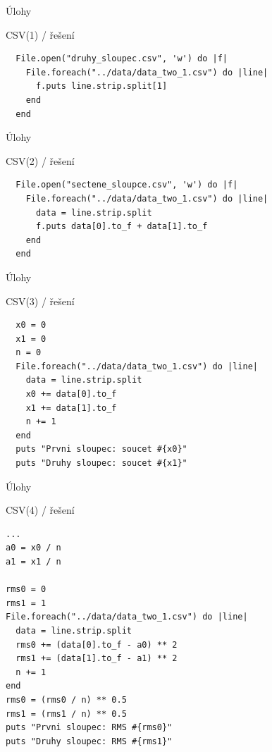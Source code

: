 \documentclass{beamer}
\begin{document}
\begin{frame}[fragile]{Úlohy}
  \begin{block}{CSV(1) / řešení}
    \scriptsize
\begin{verbatim}
  File.open("druhy_sloupec.csv", 'w') do |f|
    File.foreach("../data/data_two_1.csv") do |line|
      f.puts line.strip.split[1]
    end
  end
\end{verbatim}
  \end{block}
\end{frame}

\begin{frame}[fragile]{Úlohy}
  \begin{block}{CSV(2) / řešení}
    \scriptsize
\begin{verbatim}
  File.open("sectene_sloupce.csv", 'w') do |f|
    File.foreach("../data/data_two_1.csv") do |line|
      data = line.strip.split
      f.puts data[0].to_f + data[1].to_f
    end
  end
\end{verbatim}
  \end{block}
\end{frame}

\begin{frame}[fragile]{Úlohy}
  \begin{block}{CSV(3) / řešení}
    \scriptsize
\begin{verbatim}
  x0 = 0
  x1 = 0
  n = 0
  File.foreach("../data/data_two_1.csv") do |line|
    data = line.strip.split
    x0 += data[0].to_f
    x1 += data[1].to_f
    n += 1
  end
  puts "Prvni sloupec: soucet #{x0}"
  puts "Druhy sloupec: soucet #{x1}"
\end{verbatim}
  \end{block}
\end{frame}

\begin{frame}[fragile]{Úlohy}
  \begin{block}{CSV(4) / řešení}
    \scriptsize
\begin{verbatim}
...
a0 = x0 / n
a1 = x1 / n

rms0 = 0
rms1 = 1
File.foreach("../data/data_two_1.csv") do |line|
  data = line.strip.split
  rms0 += (data[0].to_f - a0) ** 2
  rms1 += (data[1].to_f - a1) ** 2
  n += 1
end
rms0 = (rms0 / n) ** 0.5
rms1 = (rms1 / n) ** 0.5
puts "Prvni sloupec: RMS #{rms0}"
puts "Druhy sloupec: RMS #{rms1}"
\end{verbatim}
  \end{block}
\end{frame}
\end{document}
